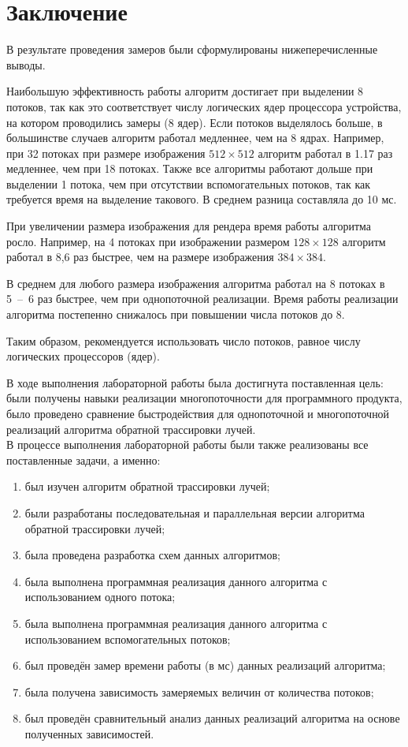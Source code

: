 \chapter*{Заключение}
В результате проведения замеров были сформулированы нижеперечисленные выводы.

Наибольшую эффективность работы алгоритм достигает при выделении 8 потоков, так как это соответствует числу логических ядер процессора устройства, на котором проводились замеры (8 ядер). Если потоков выделялось больше, в большинстве случаев алгоритм работал медленнее, чем на 8 ядрах. Например, при 32 потоках при размере изображения $512 \times 512$ алгоритм работал в 1.17 раз медленнее, чем при 18 потоках. Также все алгоритмы работают дольше при выделении 1 потока, чем при отсутствии  вспомогательных потоков, так как требуется время на выделение такового. В среднем разница составляла до 10 мс.

При увеличении размера изображения для рендера время работы алгоритма росло. Например, на 4 потоках при изображении размером $128 \times 128$ алгоритм работал в 8,6 раз быстрее, чем на размере изображения $384 \times 384$.

В среднем для любого размера изображения алгоритма работал на 8 потоках в 5~--~6 раз быстрее, чем при однопоточной реализации. Время работы реализации алгоритма постепенно снижалось при повышении числа потоков до 8.

Таким образом, рекомендуется использовать число потоков, равное числу логических процессоров (ядер).

В ходе выполнения лабораторной работы была достигнута поставленная цель: были получены навыки реализации многопоточности для программного продукта, было проведено сравнение быстродействия для однопоточной и многопоточной реализаций алгоритма обратной трассировки лучей.\\

В процессе выполнения лабораторной работы были также реализованы все поставленные задачи, а именно:
\begin{enumerate}[label={\arabic*)}]
	\item был изучен алгоритм обратной трассировки лучей;
	\item были разработаны последовательная и параллельная версии алгоритма обратной трассировки лучей;
	\item была проведена разработка схем данных алгоритмов;
	\item была выполнена программная реализация данного алгоритма с использованием одного потока;
	\item была выполнена программная реализация данного алгоритма с использованием вспомогательных потоков;
	\item был проведён замер времени работы (в мс) данных реализаций алгоритма; 
	\item была получена зависимость замеряемых величин от количества потоков;
	\item был проведён сравнительный анализ данных реализаций алгоритма на основе полученных зависимостей.
\end{enumerate}

\newpage